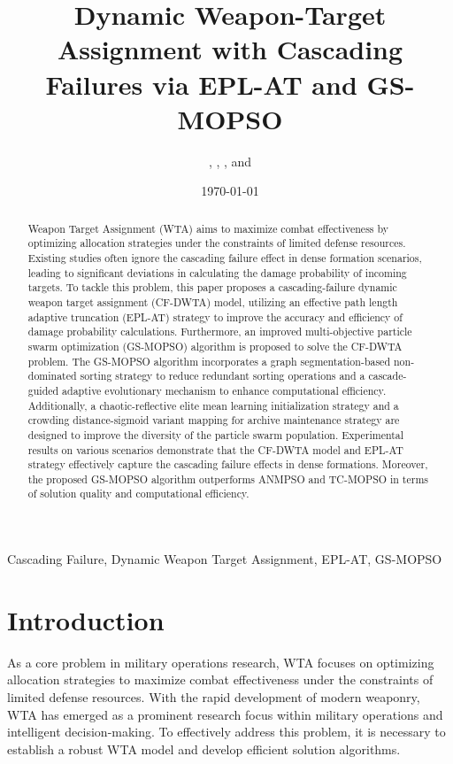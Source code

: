 \documentclass[lettersize,journal]{IEEEtran}
\begin{document}
\title{\textbf{Dynamic Weapon-Target Assignment with Cascading Failures via EPL-AT and GS-MOPSO}}
\author{, , , and }
\date{\today}
\maketitle 

\begin{abstract}
Weapon Target Assignment (WTA) aims to maximize combat effectiveness by optimizing allocation strategies under the constraints of limited defense resources. Existing studies often ignore the cascading failure effect in dense formation scenarios, leading to significant deviations in calculating the damage probability of incoming targets. To tackle this problem, this paper proposes a cascading-failure dynamic weapon target assignment (CF-DWTA) model, utilizing an effective path length adaptive truncation (EPL-AT) strategy to improve the accuracy and efficiency of damage probability calculations. Furthermore, an improved multi-objective particle swarm optimization (GS-MOPSO) algorithm is proposed to solve the CF-DWTA problem. The GS-MOPSO algorithm incorporates a graph segmentation-based non-dominated sorting strategy to reduce redundant sorting operations and a cascade-guided adaptive evolutionary mechanism to enhance computational efficiency. Additionally, a chaotic-reflective elite mean learning initialization strategy and a crowding distance-sigmoid
variant mapping for archive maintenance strategy are designed to improve the diversity of the particle swarm population. Experimental results on various scenarios demonstrate that the CF-DWTA model and EPL-AT strategy effectively capture the cascading failure effects in dense formations. Moreover, the proposed GS-MOPSO algorithm outperforms ANMPSO and TC-MOPSO in terms of solution quality and computational efficiency.
\end{abstract}

\begin{IEEEkeywords}
Cascading Failure, Dynamic Weapon Target Assignment, EPL-AT, GS-MOPSO
\end{IEEEkeywords}

\section{Introduction}

As a core problem in military operations research, WTA focuses on optimizing allocation strategies to maximize combat effectiveness under the constraints of limited defense resources\cite{manne1958target}. With the rapid development of modern weaponry, WTA has emerged as a prominent research focus within military operations and intelligent decision-making\cite{Li2024Weapon, bi2025weapon}. To effectively address this problem, it is necessary to establish a robust WTA model and develop efficient solution algorithms.
\end{document}
